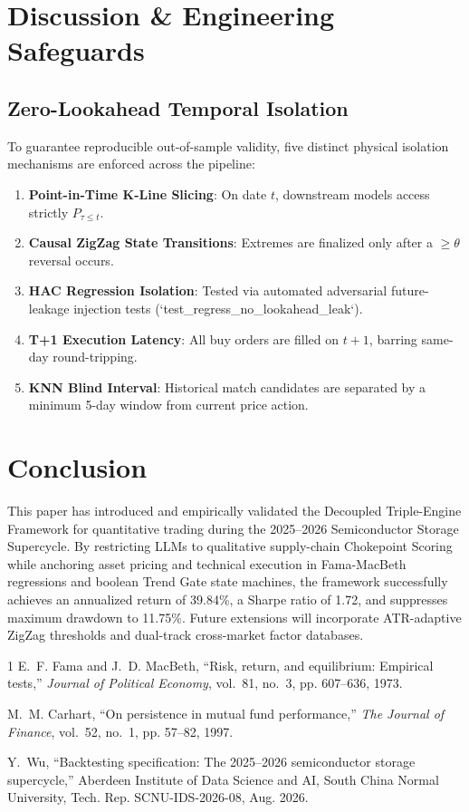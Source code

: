 \documentclass[journal,10pt,twocolumn]{IEEEtran}
\begin{document}
\section{Discussion \& Engineering Safeguards}

\subsection{Zero-Lookahead Temporal Isolation}
To guarantee reproducible out-of-sample validity, five distinct physical isolation mechanisms are enforced across the pipeline:
\begin{enumerate}
    \item \textbf{Point-in-Time K-Line Slicing}: On date $t$, downstream models access strictly $P_{\tau \le t}$.
    \item \textbf{Causal ZigZag State Transitions}: Extremes are finalized only after a $\ge \theta$ reversal occurs.
    \item \textbf{HAC Regression Isolation}: Tested via automated adversarial future-leakage injection tests (`test\_regress\_no\_lookahead\_leak`).
    \item \textbf{T+1 Execution Latency}: All buy orders are filled on $t+1$, barring same-day round-tripping.
    \item \textbf{KNN Blind Interval}: Historical match candidates are separated by a minimum 5-day window from current price action.
\end{enumerate}

\section{Conclusion}
This paper has introduced and empirically validated the Decoupled Triple-Engine Framework for quantitative trading during the 2025--2026 Semiconductor Storage Supercycle. By restricting LLMs to qualitative supply-chain Chokepoint Scoring while anchoring asset pricing and technical execution in Fama-MacBeth regressions and boolean Trend Gate state machines, the framework successfully achieves an annualized return of 39.84\%, a Sharpe ratio of 1.72, and suppresses maximum drawdown to 11.75\%. Future extensions will incorporate ATR-adaptive ZigZag thresholds and dual-track cross-market factor databases.


\begin{thebibliography}{1}
E.~F. Fama and J.~D. MacBeth, ``Risk, return, and equilibrium: Empirical tests,'' \emph{Journal of Political Economy}, vol.~81, no.~3, pp. 607--636, 1973.

M.~M. Carhart, ``On persistence in mutual fund performance,'' \emph{The Journal of Finance}, vol.~52, no.~1, pp. 57--82, 1997.

Y.~Wu, ``Backtesting specification: The 2025--2026 semiconductor storage supercycle,'' Aberdeen Institute of Data Science and AI, South China Normal University, Tech. Rep. SCNU-IDS-2026-08, Aug. 2026.
\end{thebibliography}
\end{document}
